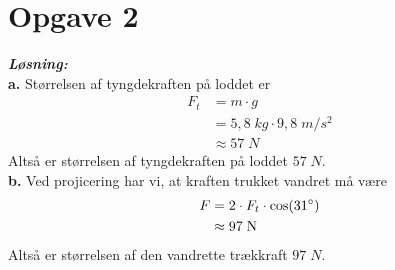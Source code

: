 \documentclass{report}
\newcommand{\sol}{\setlength{\parindent}{0cm}\textbf{\textit{Løsning:}}\setlength{\parindent}{1cm}}
\begin{document}
\section*{Opgave 2}
\sol \\
\textbf{a.}
Størrelsen af tyngdekraften på loddet er 
\begin{equation*}
\begin{split}
  F_t&=m \cdot g\\ 
  &=5,8 \;\unit{kg} \cdot 9,8 \;\unit{m/s^2} \\ 
  &\approx 57 \;\unit{N} 
\end{split}
\end{equation*}
Altså er størrelsen af tyngdekraften på loddet $57 \;\unit{N} $.\\[1ex]
\textbf{b.}
Ved projicering har vi, at kraften trukket vandret må være
\begin{equation*}
\begin{split}
  F&=2 \cdot F_t \cdot \cos (31 \degree )\\ 
  &\approx 97 \;\unit{N} 
\end{split}
\end{equation*}
Altså er størrelsen af den vandrette trækkraft $97 \;\unit{N} $.
\end{document}
